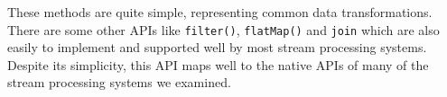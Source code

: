 These methods are quite simple, representing common data transformations. There are some other APIs like \texttt{filter()}, \texttt{flatMap()} and \texttt{join} which are also easily to implement and supported well by most stream processing systems. Despite its simplicity, this API maps well to the native APIs of many of the stream processing systems we examined.





